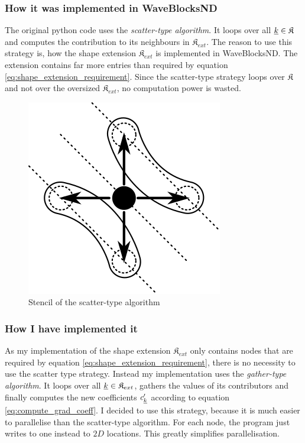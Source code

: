 \documentclass{article}
\begin{document}
\subsubsection{How it was implemented in WaveBlocksND}
The original python code uses the \emph{scatter-type algorithm}.
It loops over all \(\underline{k} \in \mathfrak{K}\) and computes the contribution
to its neighbours in \(\mathfrak{K}_{ext}\). The reason to use this strategy is,
how the shape extension \(\mathfrak{K}_{ext}\) is implemented in WaveBlocksND.
The extension contains far more entries than required by equation
\eqref{eq:shape_extension_requirement}.
Since the scatter-type strategy loops over \(\mathfrak{K}\) and
not over the oversized \(\mathfrak{K}_{ext}\), no computation power is wasted.

\begin{figure}[H]
  \centering
  \includegraphics{grad_scatter_stencil}
  \caption{Stencil of the scatter-type algorithm}
  \label{fig:grad_scatter_stencil}
\end{figure}

\subsubsection{How I have implemented it}
As my implementation of the shape extension \(\mathfrak{K}_{ext}\) only contains
nodes that are required by equation \eqref{eq:shape_extension_requirement},
there is no necessity to use the scatter type strategy.
Instead my implementation uses the \emph{gather-type algorithm}. It loops over all
\(\underline{k} \in \mathfrak{K}_{ext}\), gathers the values of its contributors
and finally computes the new coefficients \(c'_{\underline{k}}\) according to equation
\eqref{eq:compute_grad_coeff}.
I decided to use this strategy, because it is much easier to parallelise than the
scatter-type algorithm.
For each node, the program just writes to one instead to \(2D\) locations.
This greatly simplifies parallelisation.
\end{document}
